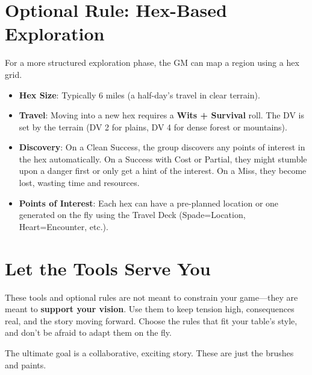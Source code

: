 \section*{Optional Rule: Hex-Based Exploration}

For a more structured exploration phase, the GM can map a region using a hex grid.

\begin{itemize}
    \item \textbf{Hex Size}: Typically 6 miles (a half-day's travel in clear terrain).
    \item \textbf{Travel}: Moving into a new hex requires a \textbf{Wits + Survival} roll. The DV is set by the terrain (DV 2 for plains, DV 4 for dense forest or mountains).
    \item \textbf{Discovery}: On a Clean Success, the group discovers any points of interest in the hex automatically. On a Success with Cost or Partial, they might stumble upon a danger first or only get a hint of the interest. On a Miss, they become lost, wasting time and resources.
    \item \textbf{Points of Interest}: Each hex can have a pre-planned location or one generated on the fly using the Travel Deck (Spade=Location, Heart=Encounter, etc.).
\end{itemize}

\section*{Let the Tools Serve You}

These tools and optional rules are not meant to constrain your game---they are meant to \textbf{support your vision}. Use them to keep tension high, consequences real, and the story moving forward. Choose the rules that fit your table's style, and don't be afraid to adapt them on the fly.

The ultimate goal is a collaborative, exciting story. These are just the brushes and paints.

